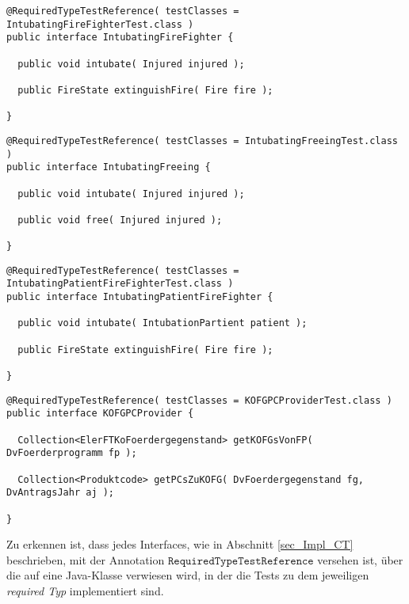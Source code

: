 \begin{lstlisting}[style = java, caption = Interface IntubatingFireFighter, captionpos = b, label = lst_interfaces_tei4]
@RequiredTypeTestReference( testClasses = IntubatingFireFighterTest.class )
public interface IntubatingFireFighter {

  public void intubate( Injured injured );

  public FireState extinguishFire( Fire fire );
  
}
\end{lstlisting}
\begin{lstlisting}[style = java, caption = Interface IntubatingFreeing, captionpos = b, label = lst_interfaces_tei5]
@RequiredTypeTestReference( testClasses = IntubatingFreeingTest.class )
public interface IntubatingFreeing {

  public void intubate( Injured injured );

  public void free( Injured injured );
  
}
\end{lstlisting}
\begin{lstlisting}[style = java, caption = Interface IntubatingPatientFireFighter, captionpos = b, label = lst_interfaces_tei6]
@RequiredTypeTestReference( testClasses = IntubatingPatientFireFighterTest.class )
public interface IntubatingPatientFireFighter {

  public void intubate( IntubationPartient patient );

  public FireState extinguishFire( Fire fire );
  
}
\end{lstlisting}
\begin{lstlisting}[style = java, caption = Interface KOFGPCProvider, captionpos = b, label = lst_interfaces_tei7]
@RequiredTypeTestReference( testClasses = KOFGPCProviderTest.class )
public interface KOFGPCProvider {

  Collection<ElerFTKoFoerdergegenstand> getKOFGsVonFP( DvFoerderprogramm fp );
 
  Collection<Produktcode> getPCsZuKOFG( DvFoerdergegenstand fg, DvAntragsJahr aj ); 
  
}
\end{lstlisting}
Zu erkennen ist, dass jedes \Gls{Interface}s, wie in Abschnitt \ref{sec_Impl_CT} beschrieben, mit der Annotation $\texttt{RequiredTypeTestReference}$ versehen ist, über die auf eine Java-Klasse verwiesen wird, in der die Tests zu dem jeweiligen \emph{required Typ} implementiert sind.
\\\\
